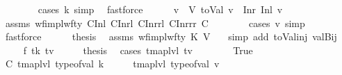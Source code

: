 \begin{isabellebody}
\ \ \ \ \ \ \isamarkupfalse%
\ {\isacharparenleft}{\kern0pt}cases\ k{\isacharsemicolon}{\kern0pt}\ simp{\isacharparenright}{\kern0pt}\ \isamarkupfalse%
\ fastforce\isanewline
\ \ \ \ \isamarkupfalse%
\ v{\isacharprime}{\kern0pt}\ \ V{\isacharcolon}{\kern0pt}\ {\isachardoublequoteopen}toVal{}{}{}{}\ v\ {\isacharequal}{\kern0pt}\ Inr\ {\isacharparenleft}{\kern0pt}Inl\ v{\isacharprime}{\kern0pt}{\isacharparenright}{\kern0pt}{\isachardoublequoteclose}\isanewline
\ \ \ \ \ \ \isamarkupfalse%
\ assms\ wf{\isacharunderscore}{\kern0pt}impl{\isacharunderscore}{\kern0pt}wf{\isacharunderscore}{\kern0pt}ty\ C{}Inl\ C{}Inrl\ C{}Inrrl\ C{}Inrrr\ C\isanewline
\ \ \ \ \ \ \isamarkupfalse%
\ {\isacharparenleft}{\kern0pt}cases\ v{\isacharsemicolon}{\kern0pt}\ simp{\isacharparenright}{\kern0pt}\ \isamarkupfalse%
\ fastforce\isanewline
\ \ \ \ \isamarkupfalse%
\ {\isacharquery}{\kern0pt}thesis\ \isamarkupfalse%
\ assms\ wf{\isacharunderscore}{\kern0pt}impl{\isacharunderscore}{\kern0pt}wf{\isacharunderscore}{\kern0pt}ty\ K\ V\ {\isachardoublequoteopen}{}{\isachardoublequoteclose}\ \isamarkupfalse%
\ {\isacharparenleft}{\kern0pt}simp\ add{\isacharcolon}{\kern0pt}\ toVal{}{}{}{}{\isacharunderscore}{\kern0pt}inj\ valBij{\isacharparenright}{\kern0pt}\isanewline
\ \ \isamarkupfalse%
\isanewline
{}\isamarkupfalse%
\isanewline
\ \ \isamarkupfalse%
\ {\isacharparenleft}{\kern0pt}{}\ f\ tk\ tv{\isacharparenright}{\kern0pt}\isanewline
\ \ \isamarkupfalse%
\ \isamarkupfalse%
\ {\isacharquery}{\kern0pt}thesis\ \isamarkupfalse%
\ {\isacharparenleft}{\kern0pt}cases\ {\isachardoublequoteopen}{\isacharparenleft}{\kern0pt}tmap{\isacharunderscore}{\kern0pt}lvl\ tv\ {\isasymle}\ {}{\isacharparenright}{\kern0pt}{\isachardoublequoteclose}{\isacharparenright}{\kern0pt}\isanewline
\ \ \ \ \isamarkupfalse%
\ True\isanewline
\ \ \ \ \isamarkupfalse%
\ \isamarkupfalse%
\ C{\isacharcolon}{\kern0pt}\ {\isachardoublequoteopen}tmap{\isacharunderscore}{\kern0pt}lvl\ {\isacharparenleft}{\kern0pt}type{\isacharunderscore}{\kern0pt}of{\isacharunderscore}{\kern0pt}val\ k{\isacharparenright}{\kern0pt}\ {\isacharequal}{\kern0pt}\ {}\ \ {\isasymand}\ \ tmap{\isacharunderscore}{\kern0pt}lvl\ {\isacharparenleft}{\kern0pt}type{\isacharunderscore}{\kern0pt}of{\isacharunderscore}{\kern0pt}val\ v{\isacharparenright}{\kern0pt}\ {\isasymle}\ {}{\isachardoublequoteclose}\isanewline

\end{isabellebody}
